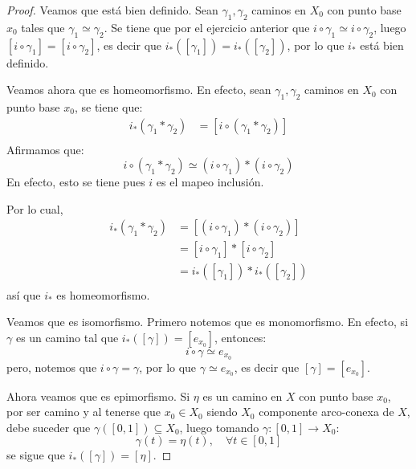 \documentclass[12pt]{report}
\newcounter{it}
\theoremstyle{largebreak}
\newcommand\cf[3]{\ensuremath{#1:#2\rightarrow#3}}
\begin{document}
    \begin{proof}
        Veamos que está bien definido. Sean $\gamma_1,\gamma_2$ caminos en $X_0$ con punto base $x_0$ tales que $\gamma_1\simeq\gamma_2$. Se tiene que por el ejercicio anterior que $i\circ\gamma_1\simeq i\circ\gamma_2$, luego $[i\circ\gamma_1]=[i\circ\gamma_2]$, es decir que $i_*([\gamma_1])=i_*([\gamma_2])$, por lo que $i_*$ está bien definido.

        Veamos ahora que es homeomorfismo. En efecto, sean $\gamma_1,\gamma_2$ caminos en $X_0$ con punto base $x_0$, se tiene que:
        \begin{equation*}
            \begin{split}
                i_*(\gamma_1*\gamma_2)&=[i\circ(\gamma_1*\gamma_2)]\\
            \end{split}
        \end{equation*}
        Afirmamos que:
        \begin{equation*}
            i\circ(\gamma_1*\gamma_2)\simeq (i\circ\gamma_1)*(i\circ\gamma_2)
        \end{equation*}
        En efecto, esto se tiene pues $i$ es el mapeo inclusión.
        
        Por lo cual,
        \begin{equation*}
            \begin{split}
                i_*(\gamma_1*\gamma_2)&=[(i\circ\gamma_1)*(i\circ\gamma_2)]\\
                &=[i\circ\gamma_1]*[i\circ\gamma_2]\\
                &=i_*([\gamma_1])*i_*([\gamma_2])\\
            \end{split}
        \end{equation*}
        así que $i_*$ es homeomorfismo.

        Veamos que es isomorfismo. Primero notemos que es monomorfismo. En efecto, si $\gamma$ es un camino tal que $i_*([\gamma])=[e_{ x_0}]$, entonces:
        \begin{equation*}
            i\circ\gamma\simeq e_{ x_0}
        \end{equation*}
        pero, notemos que $i\circ\gamma=\gamma$, por lo que $\gamma\simeq e_{ x_0}$, es decir que $[\gamma]=[e_{ x_0}]$.
        
        Ahora veamos que es epimorfismo. Si $\eta$ es un camino en $X$ con punto base $x_0$, por ser camino y al tenerse que $x_0\in X_0$ siendo $X_0$ componente arco-conexa de $X$, debe suceder que $\gamma([0,1])\subseteq X_0$, luego tomando $\cf{\gamma}{[0,1]}{X_0}$:
        \begin{equation*}
            \gamma(t)=\eta(t),\quad\forall t\in[0,1]
        \end{equation*}
        se sigue que $i_*([\gamma])=[\eta]$.
    \end{proof}
\end{document}

